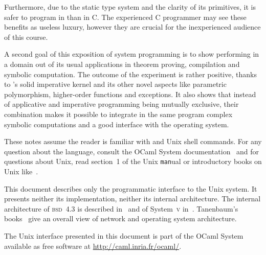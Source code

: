 Furthermore, due to the static type system and the clarity of its
primitives, it is safer to program in {\ocaml} than in C. The
experienced C programmer may see these benefits as useless luxury,
however they are crucial for the inexperienced audience of this course.

A second goal of this exposition of system programming is to show
{\ocaml} performing in a domain out of its usual applications in
theorem proving, compilation and symbolic computation. The outcome of
the experiment is rather positive, thanks to {\ocaml}'s solid
imperative kernel and its other novel aspects like parametric
polymorphism, higher-order functions and exceptions. It also shows
that instead of applicative and imperative programming being mutually
exclusive, their combination makes it possible to integrate in the
same program complex symbolic computations and a good interface with
the operating system.

These notes assume the reader is familiar with {\ocaml} and Unix shell
commands. For any question about the language, consult the OCaml
System documentation~\cite{OCaml} and for questions about Unix,
read section~1 of the Unix \texttt{man}ual or introductory books on Unix
like~\cite{KP,R1}.


This document describes only the programmatic interface to the Unix
system. It presents neither its implementation, neither its internal
architecture. The internal architecture of \textsc{bsd}~4.3 is
described in~\cite{BSD} and of System~\textsc{v}
in~\cite{Bach}. Tanenbaum's books~\cite{T1,T2} give an overall view of
network and operating system architecture.

The Unix interface presented in this document is part of the
OCaml System available as free software at
\url{http://caml.inria.fr/ocaml/}.
